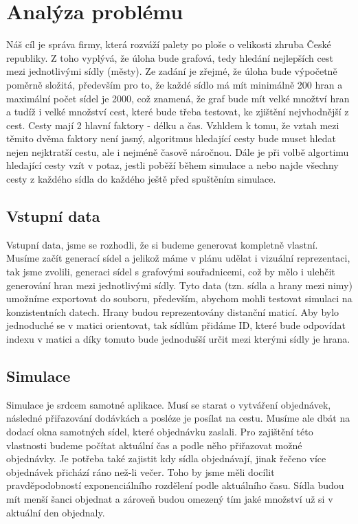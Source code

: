 \documentclass[ 12pt, a4paper]{article}
\begin{document}
\section{ Analýza problému}
Náš cíl je správa firmy, která rozváží palety po ploše o velikosti zhruba České republiky. Z toho vyplývá, že úloha bude grafová, tedy hledání nejlepších cest mezi jednotlivými sídly (městy).\newline
Ze zadání je zřejmé, že úloha bude výpočetně poměrně složitá, především pro to, že každé sídlo má mít minimálně 200 hran a maximální počet sídel je 2000, což znamená, že graf bude mít velké množtví hran a tudíž i velké množství cest, které bude třeba testovat, ke zjištění nejvhodnější z cest. Cesty mají 2 hlavní faktory - délku a čas. Vzhldem k tomu, že vztah mezi těmito dvěma faktory není jasný, algoritmus hledající cesty bude muset hledat nejen nejktratší cestu, ale i nejméně časově náročnou. Dále je při volbě algortimu hledající cesty vzít v potaz, jestli poběží během simulace a nebo najde všechny cesty z každého sídla do každého ještě před spuštěním simulace.\newline\newline
%
\subsection{Vstupní data}
Vstupní data, jsme se rozhodli, že si budeme generovat kompletně vlastní. Musíme začít generací sídel a jelikož máme v plánu udělat i vizuální reprezentaci, tak jsme zvolili, generaci sídel s grafovými souřadnicemi, což by mělo i ulehčit generování hran mezi jednotlivými sídly. Tyto data (tzn. sídla a hrany mezi nimy) umožníme exportovat do souboru, především, abychom mohli testovat simulaci na konzistentních datech.\newline
Hrany budou reprezentovány distanční maticí. Aby bylo jednoduché se v matici orientovat, tak sídlům přidáme ID, které bude odpovídat indexu v matici a díky tomuto bude jednodušší určit mezi kterými sídly je hrana.\newline\newline
%
\subsection{Simulace}
Simulace je srdcem samotné aplikace. Musí se starat o vytváření objednávek, následné přiřazování dodávkách a posléze je posílat na cestu. Musíme ale dbát na dodací okna samotných sídel, které objednávku zaslali. Pro zajištění této vlastnosti budeme počítat aktuální čas a podle něho přiřazovat možné objednávky. Je potřeba také zajistit kdy sídla objednávají, jinak řečeno více objednávek přichází ráno než-li večer. Toho by jsme měli docílit pravděpodobností exponenciálního rozdělení podle aktuálního času. Sídla budou mít menší šanci objednat a zároveň budou omezený tím jaké množství už si v aktuální den objednaly. 
\newline\newline
%
\end{document}
